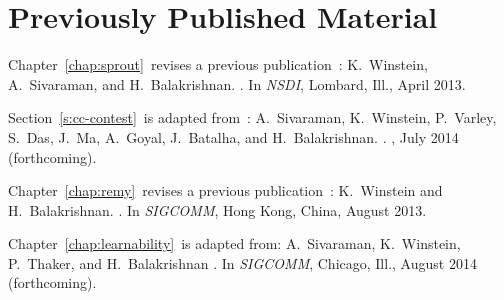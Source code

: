 \chapter*{Previously Published Material}
%

{
\setlength{\parindent}{0 pt}
\setlength{\parskip}{\baselineskip}

Chapter~\ref{chap:sprout}~revises a previous
publication~\cite{sprout}:
K.~Winstein, A.~Sivaraman, and H.~Balakrishnan.
.
\newblock In {\em NSDI}, Lombard, Ill., April 2013.

Section~\ref{s:cc-contest}~is adapted
from~\cite{cc-contest}: A.~Sivaraman, K.~Winstein, P.~Varley, S.~Das,
J.~Ma, A.~Goyal, J.~Batalha, and H.~Balakrishnan.  .  , July 2014 (forthcoming).

Chapter~\ref{chap:remy}~revises a previous publication~\cite{remy}:
K.~Winstein and H.~Balakrishnan.
.
\newblock In {\em SIGCOMM}, Hong Kong, China, August 2013.

Chapter~\ref{chap:learnability}~is adapted from:
A.~Sivaraman, K.~Winstein, P.~Thaker, and H.~Balakrishnan
. \newblock In {\em
  SIGCOMM}, Chicago, Ill., August 2014 (forthcoming).

}
